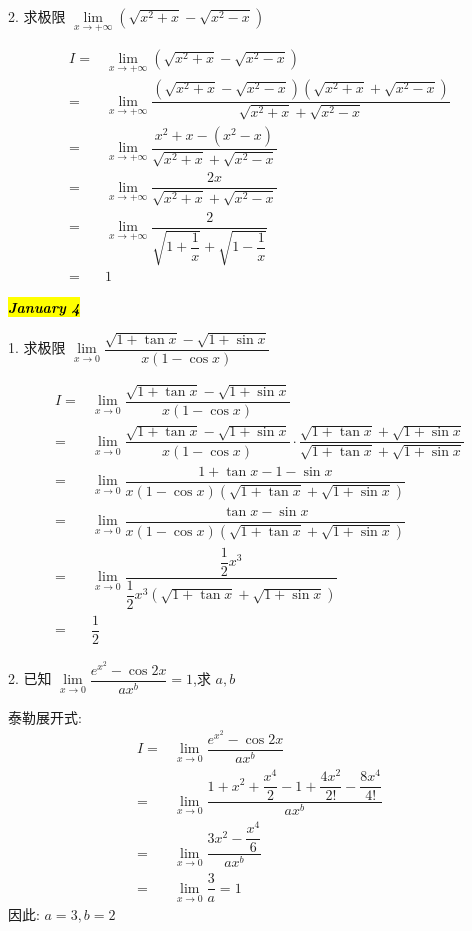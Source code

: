 2. 求极限 $\lim\limits_{x\to+\infty}(\sqrt{x^{2}+x}-\sqrt{x^{2}-x})$
\begin{solution}

	\begin{align*}
		I = & \lim\limits_{x\to+\infty}(\sqrt{x^{2}+x}-\sqrt{x^{2}-x})\\
		  = & \lim\limits_{x\to+\infty}\dfrac{(\sqrt{x^{2}+x}-\sqrt{x^{2}-x})(\sqrt{x^{2}+x}+\sqrt{x^{2}-x})}{\sqrt{x^{2}+x}+\sqrt{x^{2}-x}}\\
		  = & \lim\limits_{x\to+\infty}\dfrac{x^{2}+x-(x^{2}-x)}{\sqrt{x^{2}+x}+\sqrt{x^{2}-x}}\\
		  = & \lim\limits_{x\to+\infty}\dfrac{2x}{\sqrt{x^{2}+x}+\sqrt{x^{2}-x}}\\
		  = & \lim\limits_{x\to+\infty}\dfrac{2}{\sqrt{1+\dfrac{1}{x}}+\sqrt{1-\dfrac{1}{x}}}\\
		  = & 1
	\end{align*}
\end{solution}

\hl{\textbf{\textit{January 4}}}

1. 求极限 $\lim\limits_{x\to 0}\dfrac{\sqrt{1+\tan x}-\sqrt{1+\sin x}}{x(1-\cos x)}$
\begin{solution}

	\begin{align*}
		I = & \lim\limits_{x\to 0}\dfrac{\sqrt{1+\tan x}-\sqrt{1+\sin x}}{x(1-\cos x)}\\
		  = & \lim\limits_{x\to 0}\dfrac{\sqrt{1+\tan x}-\sqrt{1+\sin x}}{x(1-\cos x)}\cdot \dfrac{\sqrt{1+\tan x}+\sqrt{1+\sin x}}{\sqrt{1+\tan x}+\sqrt{1+\sin x}}\\
		  = & \lim\limits_{x\to 0}\dfrac{1+\tan x-1-\sin x}{x(1-\cos x)(\sqrt{1+\tan x}+\sqrt{1+\sin x})}\\
		  = & \lim\limits_{x\to 0}\dfrac{\tan x-\sin x}{x(1-\cos x)(\sqrt{1+\tan x}+\sqrt{1+\sin x})}\\
		  = & \lim\limits_{x\to 0}\dfrac{\dfrac{1}{2}x^{3}}{\dfrac{1}{2}x^{3}(\sqrt{1+\tan x}+\sqrt{1+\sin x})}\\
		  = & \dfrac{1}{2}
	\end{align*}
\end{solution}

2. 已知 $\lim\limits_{x\to 0}\dfrac{e^{x^{2}}-\cos 2x}{ax^{b}}=1$,求 $a,b$
\begin{solution}

	泰勒展开式:
	\begin{align*}
		I = & \lim\limits_{x\to 0}\dfrac{e^{x^{2}}-\cos 2x}{ax^{b}}\\
		  = & \lim\limits_{x\to 0}\dfrac{1+x^{2}+\dfrac{x^{4}}{2}-1+\dfrac{4x^{2}}{2!}-\dfrac{8x^{4}}{4!}}{ax^{b}}\\
		  = & \lim\limits_{x\to 0}\dfrac{3x^{2}-\dfrac{x^{4}}{6}}{ax^{b}}\\
		  = & \lim\limits_{x\to 0}\dfrac{3}{a} = 1
	\end{align*}
	因此: $a = 3, b = 2$
\end{solution}


